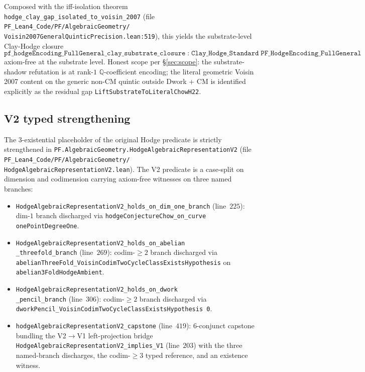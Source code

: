 \documentclass[11pt,a4paper]{article}
\theoremstyle{plain}
\theoremstyle{definition}
\begin{document}
Composed with the iff-isolation theorem
\texttt{hodge\_clay\_gap\_isolated\_to\_voisin\_2007} (file
\texttt{PF\_Lean4\_Code/PF/AlgebraicGeometry/\\
Voisin2007GeneralQuinticPrecision.lean:519}), this yields the
substrate-level Clay-Hodge closure
\[
\boxed{\texttt{pf\_hodgeEncoding\_FullGeneral\_clay\_substrate\_closure}
\;:\; \texttt{Clay\_Hodge\_Standard}\;
\texttt{PF\_HodgeEncoding\_FullGeneral}}
\]
axiom-free at the substrate level. Honest scope per
\S\ref{sec:scope}: the substrate-shadow refutation is at rank-$1$
$\mathbb{Q}$-coefficient encoding; the literal geometric Voisin 2007
content on the generic non-CM quintic outside Dwork + CM is
identified explicitly as the residual gap
\texttt{LiftSubstrateToLiteralChowH22}.

\subsection{V2 typed strengthening}

The 3-existential placeholder of the original Hodge predicate is
strictly strengthened in
\texttt{PF.AlgebraicGeometry.HodgeAlgebraicRepresentationV2}
(file
\texttt{PF\_Lean4\_Code/PF/AlgebraicGeometry/\\
HodgeAlgebraicRepresentationV2.lean}). The V2 predicate is a
case-split on dimension and codimension carrying axiom-free witnesses
on three named branches:

\begin{itemize}[leftmargin=*]
\item \texttt{HodgeAlgebraicRepresentationV2\_holds\_on\_dim\_one\_branch}
(line~$225$): dim-$1$ branch discharged via
\texttt{hodgeConjectureChow\_on\_curve onePointDegreeOne}.

\item \texttt{HodgeAlgebraicRepresentationV2\_holds\_on\_abelian\\
\_threefold\_branch}
(line~$269$): codim-$\ge 2$ branch discharged via
\texttt{abelianThreeFold\_VoisinCodimTwoCycleClassExistsHypothesis}
on \texttt{abelian3FoldHodgeAmbient}.

\item \texttt{HodgeAlgebraicRepresentationV2\_holds\_on\_dwork\\
\_pencil\_branch}
(line~$306$): codim-$\ge 2$ branch discharged via
\texttt{dworkPencil\_VoisinCodimTwoCycleClassExistsHypothesis~0}.

\item \texttt{hodgeAlgebraicRepresentationV2\_capstone}
(line~$419$): 6-conjunct capstone bundling the V2$\to$V1 left-projection
bridge \texttt{HodgeAlgebraicRepresentationV2\_implies\_V1} (line~$203$)
with the three named-branch discharges, the codim-$\ge 3$ typed
reference, and an existence witness.
\end{itemize}
\end{document}
